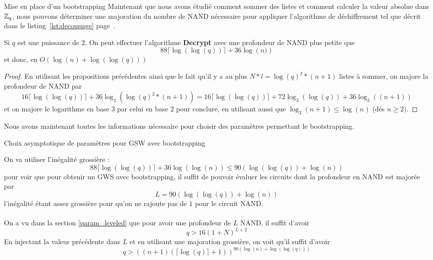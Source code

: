 \begin{section}{Mise en place d'un bootstrapping}
Maintenant que nous avons étudié comment sommer des listes et comment calculer la valeur absolue dans
$\mathbb{Z}_q$, nous pouvons déterminer une majoration du nombre de NAND nécessaire pour appliquer l'algorithme
de déchiffrement tel que décrit dans le listing~\ref{lst:decoupage} page~\pageref{lst:decoupage}.
\begin{thm} \label{size_dec}
Si $q$ est une puissance de $2$.
On peut effectuer 
l'algorithme \textbf{Decrypt} avec une profondeur de NAND plus petite que
\[88 \lceil \log(\log(q)) \rceil + 36 \log\left(n)\right) \]
et donc, en $O(\log(n) + \log(\log(q)))$
\end{thm}
\begin{proof}
En utilisant les propositions précédentes ainsi que le fait qu'il y a au plus $N*l = \log(q)^2 * (n+1)$ listes à
sommer, on majore la profondeur de NAND par
\[16 \lceil \log(\log(q)) \rceil + 36 \log_3\left(\log(q)^2
*(n+1)\right) = 16 \lceil \log(\log(q)) \rceil + 72 \log_3(\log(q)) + 36 \log_3\left((n+1)\right) \]
et on majore le logarithme en base $3$ par celui en base $2$ pour conclure, en
utilisant aussi que $\log_3(n+1) \leqslant\log(n)$ (dés $n \geq 2)$.
\end{proof}

Nous avons maintenant toutes les informations nécessaire pour choisir des paramètres permettant le bootstrapping.

\begin{subsection}{Choix asymptotique de paramètres pour GSW avec bootstrapping}
\label{sec:bootstrapping}

On va utiliser l'inégalité grossière :
\[
88 \lceil\log(\log(q))\rceil + 36 \log(\log(n)) \leqslant 90\left(\log(\log(q)) + \log(n)\right) \]
pour voir que pour obtenir un  GWS avec bootstrapping, il suffit de pouvoir évaluer les circuits 
dont la profondeur en NAND est majorée par
\[ L = 90 \left(\log(\log(q)) + \log(n)\right) \]
l'inégalité étant assez grossière pour qu'on ne rajoute pas de $1$ pour le circuit NAND.

\paragraph{}
On a vu dans la section \ref{param_leveled} que pour avoir une
profondeur de $L$ NAND, il suffit d'avoir
\begin{equation*}
q > 16 {(1+N)}^{L+2}
\end{equation*}
En injectant la valeur précédente dans $L$ et en utilisant une majoration
grossière, on voit qu'il suffit d'avoir
\begin{equation}
q > {\left((n+1)(\lceil \log(q) \rceil + 1 )\right)}^{90 \left(\log(n) +
\log(\log(q))\right)}
\end{equation}


\end{subsection}
\end{section}
